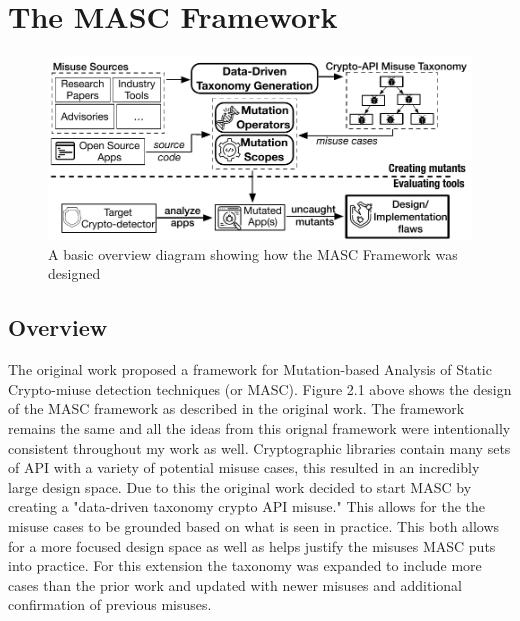 \chapter{The MASC Framework}
\label{chap_framework}
\begin{figure}[!ht]
	\centering
    \includegraphics[width=0.96\linewidth]{figures/overview.pdf}
	\vspace{-1.em}
    \caption{\small A basic overview diagram showing how the MASC Framework was designed}
    \label{fig:overview}
	
\end{figure}
\section{Overview}
\label{ch2:sec:overview}

The original work proposed a framework for Mutation-based Analysis of Static Crypto-miuse detection techniques (or MASC). Figure 2.1 above shows the design of the MASC framework as described in the original work. The framework remains the same and all the ideas from this orignal framework were intentionally consistent throughout my work as well. Cryptographic libraries contain many sets of API with a variety of potential misuse cases, this resulted in an incredibly large design space. Due to this the original work decided to start MASC by creating a "data-driven taxonomy crypto API misuse." This allows for the the misuse cases to be grounded based on what is seen in practice. This both allows for a more focused design space as well as helps justify the misuses MASC puts into practice. For this extension the taxonomy was expanded to include more cases than the prior work and updated with newer misuses and additional confirmation of previous misuses.

